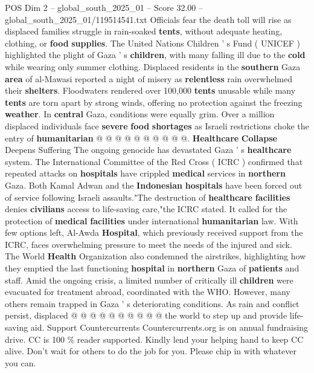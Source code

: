 \begin{textsample}{POS Dim 2 – global\_south\_2025\_01 – Score 32.00 – global\_south\_2025\_01/119514541.txt}
Officials fear the death toll will rise as displaced families struggle in rain-soaked \textbf{tents}, without adequate heating, clothing, or \textbf{food} \textbf{supplies}.
The United Nations Children ' s Fund ( UNICEF ) highlighted the plight of Gaza ' s \textbf{children}, with many falling ill due to the \textbf{cold} while wearing only summer clothing.
Displaced residents in the \textbf{southern} Gaza \textbf{area} of al-Mawasi reported a night of misery as \textbf{relentless} rain overwhelmed their \textbf{shelters}.
Floodwaters rendered over 100,000 \textbf{tents} unusable while many \textbf{tents} are torn apart by strong winds, offering no protection against the freezing \textbf{weather}.
In \textbf{central} Gaza, conditions were equally grim.
Over a million displaced individuals face \textbf{severe} \textbf{food} \textbf{shortages} as Israeli restrictions choke the entry of \textbf{humanitarian} @ @ @ @ @ @ @ @ @ @. \textbf{Healthcare} \textbf{Collapse} Deepens Suffering The ongoing genocide has devastated Gaza ' s \textbf{healthcare} system.
The International Committee of the Red Cross ( ICRC ) confirmed that repeated attacks on \textbf{hospitals} have crippled \textbf{medical} services in \textbf{northern} Gaza.
Both Kamal Adwan and the \textbf{Indonesian} \textbf{hospitals} have been forced out of service following Israeli assaults."The destruction of \textbf{healthcare} \textbf{facilities} denies \textbf{civilians} access to life-saving care,"the ICRC stated.
It called for the protection of \textbf{medical} \textbf{facilities} under international \textbf{humanitarian} law.
With few options left, Al-Awda \textbf{Hospital}, which previously received support from the ICRC, faces overwhelming pressure to meet the needs of the injured and sick.
The World \textbf{Health} Organization also condemned the airstrikes, highlighting how they emptied the last functioning \textbf{hospital} in \textbf{northern} Gaza of \textbf{patients} and staff.
Amid the ongoing crisis, a limited number of critically ill \textbf{children} were evacuated for treatment abroad, coordinated with the WHO.
However, many others remain trapped in Gaza ' s deteriorating conditions.
As rain and conflict persist, displaced @ @ @ @ @ @ @ @ @ @ the world to step up and provide life-saving aid.
Support Countercurrents Countercurrents.org is on annual fundraising drive.
CC is 100 \% reader supported.
Kindly lend your helping hand to keep CC alive.
Don't wait for others to do the job for you.
Please chip in with whatever you can.

\end{textsample}
